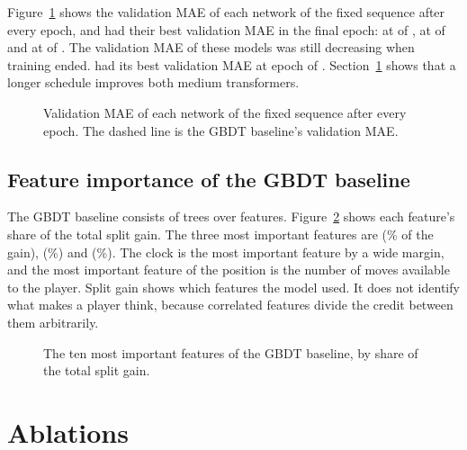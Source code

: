 \documentclass[11pt]{article}
\begin{document}
Figure~\ref{fig:curves} shows the validation MAE of each network of the fixed
sequence after every epoch, and  had their best
validation MAE in the final epoch:  at
 of ,
 at  of
 and  at
 of .
The validation MAE of these models was still decreasing when training ended.
 had its best validation MAE at epoch
 of
.
\ifchangeepochs
Section~\ref{sec:ablations} shows that a longer schedule improves both medium
transformers.
\fi

\begin{figure}[htbp]\centering
{}
\caption{Validation MAE of each network of the fixed sequence after every
epoch. The dashed line is the GBDT baseline's validation MAE.}
\label{fig:curves}
\end{figure}

\subsection{Feature importance of the GBDT baseline}

The GBDT baseline consists of  trees over
 features. Figure~\ref{fig:leans} shows each feature's
share of the total split gain. The three most important features are
 (\% of the gain),
 (\%) and
 (\%). The clock is
the most important feature by a wide margin, and the most important feature
of the position is the number of moves available to the player. Split gain
shows which features the model used. It does not identify what makes a
player think, because correlated features divide the credit between them
arbitrarily.

\begin{figure}[htbp]\centering
{}
\caption{The ten most important features of the GBDT baseline, by share of
the total split gain.}
\label{fig:leans}
\end{figure}

\ifchanges
\section{Ablations}
\label{sec:ablations}
\end{document}
